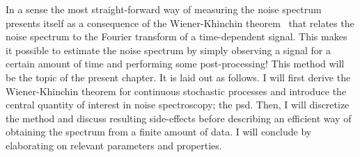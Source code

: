 In a sense the most straight-forward way of measuring the noise spectrum presents itself as a consequence of the Wiener-Khinchin theorem~\cite{Wiener1930,Khintchine1934} that relates the noise spectrum to the Fourier transform of a time-dependent signal.
This makes it possible to estimate the noise spectrum by simply observing a signal for a certain amount of time and performing some post-processing!
This method will be the topic of the present chapter.
It is laid out as follows.
I will first derive the Wiener-Khinchin theorem for continuous stochastic processes and introduce the central quantity of interest in noise spectroscopy; the \acrfull{psd}.
Then, I will discretize the method and discuss resulting side-effects before describing an efficient way of obtaining the spectrum from a finite amount of data.
I will conclude by elaborating on relevant parameters and properties.

